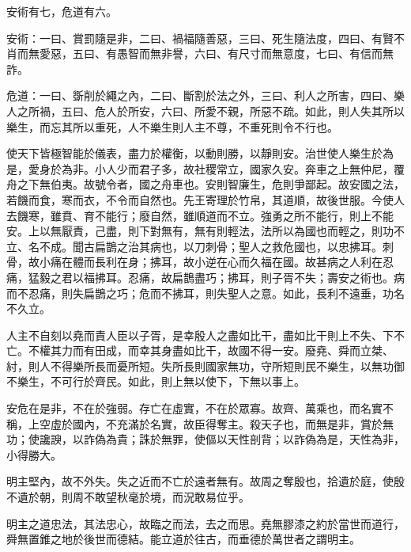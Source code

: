
\begin{pinyinscope}
安術有七，危道有六。

安術：一曰、賞罰隨是非，二曰、禍福隨善惡，三曰、死生隨法度，四曰、有賢不肖而無愛惡，五曰、有愚智而無非譽，六曰、有尺寸而無意度，七曰、有信而無詐。

危道：一曰、斲削於繩之內，二曰、斷割於法之外，三曰、利人之所害，四曰、樂人之所禍，五曰、危人於所安，六曰、所愛不親，所惡不疏。如此，則人失其所以樂生，而忘其所以重死，人不樂生則人主不尊，不重死則令不行也。

使天下皆極智能於儀表，盡力於權衡，以動則勝，以靜則安。治世使人樂生於為是，愛身於為非。小人少而君子多，故社稷常立，國家久安。奔車之上無仲尼，覆舟之下無伯夷。故號令者，國之舟車也。安則智廉生，危則爭鄙起。故安國之法，若饑而食，寒而衣，不令而自然也。先王寄理於竹帛，其道順，故後世服。今使人去饑寒，雖賁、育不能行；廢自然，雖順道而不立。強勇之所不能行，則上不能安。上以無厭責，己盡，則下對無有，無有則輕法，法所以為國也而輕之，則功不立、名不成。聞古扁鵲之治其病也，以刀刺骨；聖人之救危國也，以忠拂耳。刺骨，故小痛在體而長利在身；拂耳，故小逆在心而久福在國。故甚病之人利在忍痛，猛毅之君以福拂耳。忍痛，故扁鵲盡巧；拂耳，則子胥不失；壽安之術也。病而不忍痛，則失扁鵲之巧；危而不拂耳，則失聖人之意。如此，長利不遠垂，功名不久立。

人主不自刻以堯而責人臣以子胥，是幸殷人之盡如比干，盡如比干則上不失、下不亡。不權其力而有田成，而幸其身盡如比干，故國不得一安。廢堯、舜而立桀、紂，則人不得樂所長而憂所短。失所長則國家無功，守所短則民不樂生，以無功御不樂生，不可行於齊民。如此，則上無以使下，下無以事上。

安危在是非，不在於強弱。存亡在虛實，不在於眾寡。故齊、萬乘也，而名實不稱，上空虛於國內，不充滿於名實，故臣得奪主。殺天子也，而無是非，賞於無功；使讒諛，以詐偽為貴；誅於無罪，使傴以天性剖背；以詐偽為是，天性為非，小得勝大。

明主堅內，故不外失。失之近而不亡於遠者無有。故周之奪殷也，拾遺於庭，使殷不遺於朝，則周不敢望秋毫於境，而況敢易位乎。

明主之道忠法，其法忠心，故臨之而法，去之而思。堯無膠漆之約於當世而道行，舜無置錐之地於後世而德結。能立道於往古，而垂德於萬世者之謂明主。


\end{pinyinscope}
